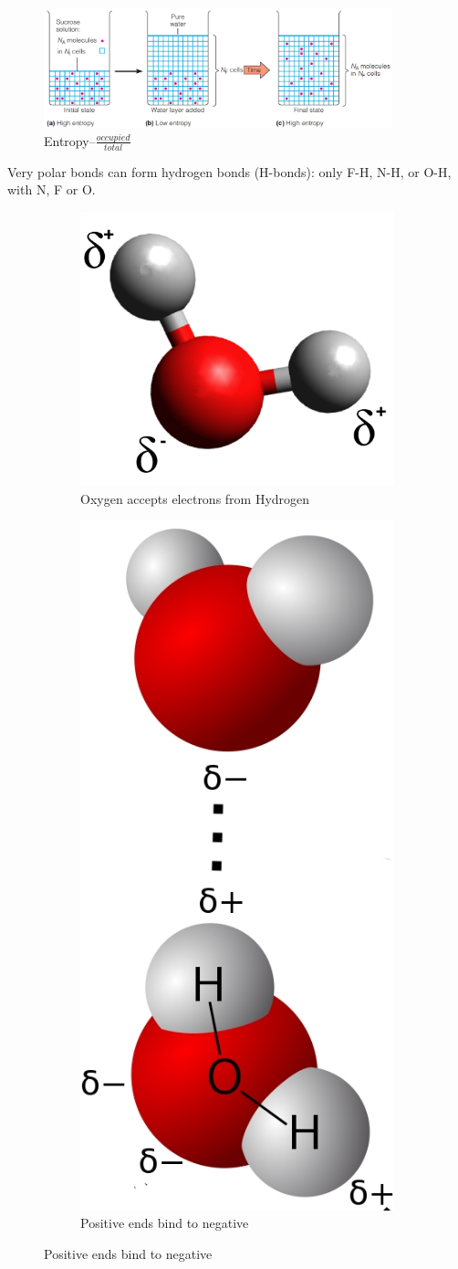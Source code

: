 \documentclass[]{article}
\begin{document}
\begin{figure}[H]
	\caption{Entropy--$\frac{occupied}{total}$} \label{fig:EntropySugar} 
	\includegraphics[width=0.9\textwidth]{EntropySugar}
\end{figure}

Very polar bonds can form hydrogen bonds (H-bonds): only F-H, N-H, or O-H, with
N, F or O.

\begin{figure}[H]
	\centering
		\caption{Very polar bonds can form hydrogen bonds} \label{fig:EnthalpyHydrogenBonds} 
	\begin{subfigure}{.5\textwidth}
		\centering
		\includegraphics[width=.4\linewidth]{EnthalpyHydrogenBonds}
		\caption{Oxygen accepts electrons from Hydrogen}
	\end{subfigure}%
	\begin{subfigure}{.5\textwidth}
		\centering
		\includegraphics[width=.4\linewidth]{EnthalpyHydrogenBondMore}
		\caption{Positive ends bind to negative}
	\end{subfigure}
\end{figure}
\end{document}
